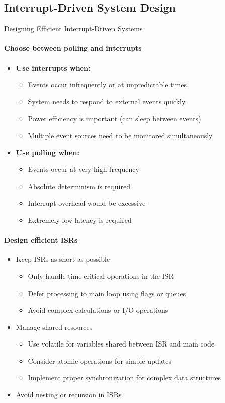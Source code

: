 \subsection{Interrupt-Driven System Design}




\begin{KR}{Designing Efficient Interrupt-Driven Systems}
\paragraph{Choose between polling and interrupts}
\begin{itemize}
    \item \textbf{Use interrupts when:}
    \begin{itemize}
        \item Events occur infrequently or at unpredictable times
        \item System needs to respond to external events quickly
        \item Power efficiency is important (can sleep between events)
        \item Multiple event sources need to be monitored simultaneously
    \end{itemize}
    \item \textbf{Use polling when:}
    \begin{itemize}
        \item Events occur at very high frequency
        \item Absolute determinism is required
        \item Interrupt overhead would be excessive
        \item Extremely low latency is required
    \end{itemize}
\end{itemize}

\paragraph{Design efficient ISRs}
\begin{itemize}
    \item Keep ISRs as short as possible
    \begin{itemize}
        \item Only handle time-critical operations in the ISR
        \item Defer processing to main loop using flags or queues
        \item Avoid complex calculations or I/O operations
    \end{itemize}
    \item Manage shared resources
    \begin{itemize}
        \item Use volatile for variables shared between ISR and main code
        \item Consider atomic operations for simple updates
        \item Implement proper synchronization for complex data structures
    \end{itemize}
    \item Avoid nesting or recursion in ISRs
\end{itemize}


\end{KR}

